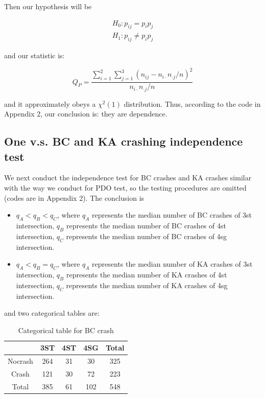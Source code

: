 \documentclass[11pt]{scrartcl} %
\begin{document}
Then our hypothesis will be 

\begin{equation*}
\begin{array}{l}
{H_0}:{p_{ij}} = {p_i}{p_j}\\
{H_1}:{p_{ij}} \ne {p_i}{p_j}
\end{array}
\end{equation*}

and our statistic is:

\begin{equation*}
{Q_P} = \frac{{\sum\limits_{i = 1}^2 {\sum\limits_{j = 1}^3 {{{\left( {{n_{ij}} - {n_{i \cdot }}{n_{ \cdot j}}/n} \right)}^2}} } }}{{{n_{i \cdot }}{n_{ \cdot j}}/n}}
\end{equation*}

and it approximately obeys a ${\chi ^2}\left( 1 \right)$ distribution. Thus, according to the code in Appendix 2, our conclusion is: they are dependence.

\subsection{One v.s. BC and KA crashing independence test}

We next conduct the independence test for BC crashes and KA crashes similar with the way we conduct for PDO test, so the testing procedures are omitted (codes are in Appendix 2). The conclusion is

\begin{itemize}
	\item ${q_A} < {q_B} < {q_C}$, where $q_A$ represents the median number of BC crashes of 3st intersection, $q_B$ represents the median number of BC crashes of 4st intersection, $q_C$ represents the median number of BC crashes of 4sg intersection.
	\item ${q_A} < {q_B} = {q_C}$, where $q_A$ represents the median number of KA crashes of 3st intersection, $q_B$ represents the median number of KA crashes of 4st intersection, $q_C$ represents the median number of KA crashes of 4sg intersection.
\end{itemize}

and two categorical tables are:

\begin{table}[H]
\caption{Categorical table for BC crash}
\centering
\begin{tabular}{|c|c|c|c|c|}
\hline
      & 3ST & 4ST & 4SG & Total \\
\hline
Nocrash & 264 & 31  & 30 & 325 \\
\hline
Crash    & 121  & 30  & 72  & 223 \\
\hline
Total    & 385  & 61  & 102  & 548 \\
\hline
\end{tabular}
\end{table}
\end{document}
